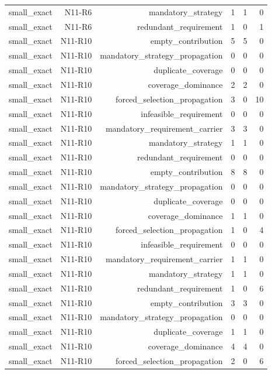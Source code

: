 {\begin{longtable}{lrrrrr}
small\_exact & N11-R6 & mandatory\_strategy & 1 & 1 & 0 \\
small\_exact & N11-R6 & redundant\_requirement & 1 & 0 & 1 \\
small\_exact & N11-R10 & empty\_contribution & 5 & 5 & 0 \\
small\_exact & N11-R10 & mandatory\_strategy\_propagation & 0 & 0 & 0 \\
small\_exact & N11-R10 & duplicate\_coverage & 0 & 0 & 0 \\
small\_exact & N11-R10 & coverage\_dominance & 2 & 2 & 0 \\
small\_exact & N11-R10 & forced\_selection\_propagation & 3 & 0 & 10 \\
small\_exact & N11-R10 & infeasible\_requirement & 0 & 0 & 0 \\
small\_exact & N11-R10 & mandatory\_requirement\_carrier & 3 & 3 & 0 \\
small\_exact & N11-R10 & mandatory\_strategy & 1 & 1 & 0 \\
small\_exact & N11-R10 & redundant\_requirement & 0 & 0 & 0 \\
small\_exact & N11-R10 & empty\_contribution & 8 & 8 & 0 \\
small\_exact & N11-R10 & mandatory\_strategy\_propagation & 0 & 0 & 0 \\
small\_exact & N11-R10 & duplicate\_coverage & 0 & 0 & 0 \\
small\_exact & N11-R10 & coverage\_dominance & 1 & 1 & 0 \\
small\_exact & N11-R10 & forced\_selection\_propagation & 1 & 0 & 4 \\
small\_exact & N11-R10 & infeasible\_requirement & 0 & 0 & 0 \\
small\_exact & N11-R10 & mandatory\_requirement\_carrier & 1 & 1 & 0 \\
small\_exact & N11-R10 & mandatory\_strategy & 1 & 1 & 0 \\
small\_exact & N11-R10 & redundant\_requirement & 1 & 0 & 6 \\
small\_exact & N11-R10 & empty\_contribution & 3 & 3 & 0 \\
small\_exact & N11-R10 & mandatory\_strategy\_propagation & 0 & 0 & 0 \\
small\_exact & N11-R10 & duplicate\_coverage & 1 & 1 & 0 \\
small\_exact & N11-R10 & coverage\_dominance & 4 & 4 & 0 \\
small\_exact & N11-R10 & forced\_selection\_propagation & 2 & 0 & 6 \\

\end{longtable}}
